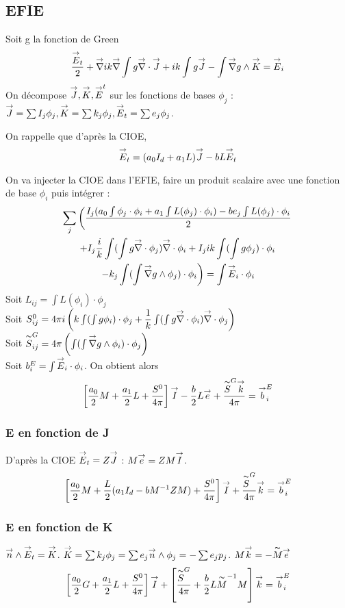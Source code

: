 \subsection{EFIE}
Soit g la fonction de Green
\[
  \frac{\vE_t}{2}+\vgrad{i}{k}\vgrad \int  g\vdiv\vJ +  ik\int g\vJ - \int \vgrad g \pvect \vK = \vE_i
  \]
On décompose \(\vJ,\vK,\vE^t\) sur les fonctions de bases \(\phi_j\) : \(\vJ = \sum I_j \phi_j,\vK = \sum k_j \phi_j,\vE_t = \sum e_j \phi_j\). 

On rappelle que d’après la CIOE,
\[
  \vE_t = (a_0I_d+a_1L)\vJ -bL\vE_t
\]

On va injecter la CIOE dans l'EFIE, faire un produit scalaire avec une fonction de base \(\phi_i\) puis intégrer : 
\begin{multline}
  \sum_j \left(\frac{I_j(a_0\int \phi_j \cdot \phi_i +a_1\int L(\phi_j) \cdot \phi_i) -be_j \int L(\phi_j)\cdot \phi_i}{2} \right. \\
  +I_j\frac{i}{k}\int (\int g\vdiv\phi_j)\vdiv \phi_i +  I_j ik\int (\int g\phi_j)\cdot \phi_i\\
  \left. -  k_j\int(\int \vgrad g \pvect \phi_j) \cdot \phi_i \right)= \int \vE_i \cdot \phi_i
\end{multline}
Soit \(L_{ij} = \int L(\phi_i)\cdot\phi_j\)\\
Soit \(S^0_{ij}=4\pi i\left(k\int(\int g\phi_i)\cdot\phi_j + \frac{1}{k}\int(\int g\vdiv\phi_i)\vdiv\phi_j\right)\)\\ 
Soit \(\tilde S^G_{ij} = 4\pi\left(\int(\int \vgrad g \pvect \phi_i) \cdot \phi_j \right)\)\\
Soit \(b_i^E = \int \vE_i \cdot \phi_i\).
On obtient alors 
\[
  \left[\frac{a_0}{2}M + \frac{a_1}{2}L + \frac{S^0}{4\pi}\right]\vect I - \frac{b}{2}L\vect e+ \frac{\tilde  S^G \vect k}{4\pi} = \vect b_i^E
\]
\subsubsection{E en fonction de J}
D’après la CIOE \(\vE_t = Z\vJ\) : \(M\vect e = Z M\vect I\).
\[
  \left[\frac{a_0}{2}M + \frac{L}{2}(a_1I_d - bM^{-1}ZM) + \frac{S^0}{4\pi}\right]\vect I + \frac{\tilde S^G }{4\pi}\vect k = \vect b_i^E
\]
\subsubsection{E en fonction de K}
\(\vn \pvect \vE_t = \vK\).
\(\vK = \sum k_j \phi_j = \sum e_j \vn \pvect \phi_j = -\sum e_j p_j \).
\(M \vect k = - \tilde M \vect e\)
\[
  \left[\frac{a_0}{2}G + \frac{a_1}{2}L+\frac{S^0}{4\pi}\right]\vect I + \left[\frac{\tilde S^G }{4\pi}+  \frac{b}{2}L\tilde M^{-1}M \right]\vect k = \vect b_i^E
\]
